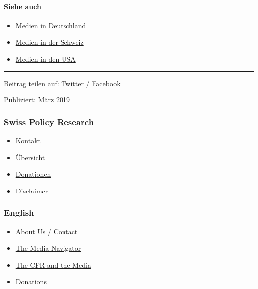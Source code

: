 \hypertarget{siehe-auch}{%
\paragraph{Siehe auch}\label{siehe-auch}}

\begin{itemize}
\tightlist
\item
  \href{https://swprs.org/netzwerk-medien-deutschland/}{Medien in
  Deutschland}
\item
  \href{https://swprs.org/netzwerk-medien-schweiz/}{Medien in der
  Schweiz}
\item
  \href{https://swprs.org/das-american-empire-und-seine-medien/}{Medien
  in den USA}
\end{itemize}

\begin{center}\rule{0.5\linewidth}{\linethickness}\end{center}

Beitrag teilen auf:
\href{https://twitter.com/intent/tweet?url=https://swprs.org/medien-in-oesterreich/}{Twitter}
/
\href{https://www.facebook.com/share.php?u=https://swprs.org/medien-in-oesterreich/}{Facebook}

Publiziert: März 2019

\hypertarget{swiss-policy-research}{%
\subsubsection{Swiss Policy Research}\label{swiss-policy-research}}

\begin{itemize}
\tightlist
\item
  \href{https://swprs.org/kontakt/}{Kontakt}
\item
  \href{https://swprs.org/uebersicht/}{Übersicht}
\item
  \href{https://swprs.org/donationen/}{Donationen}
\item
  \href{https://swprs.org/disclaimer/}{Disclaimer}
\end{itemize}

\hypertarget{english}{%
\subsubsection{English}\label{english}}

\begin{itemize}
\tightlist
\item
  \href{https://swprs.org/contact/}{About Us / Contact}
\item
  \href{https://swprs.org/media-navigator/}{The Media Navigator}
\item
  \href{https://swprs.org/the-american-empire-and-its-media/}{The CFR
  and the Media}
\item
  \href{https://swprs.org/donations/}{Donations}
\end{itemize}

